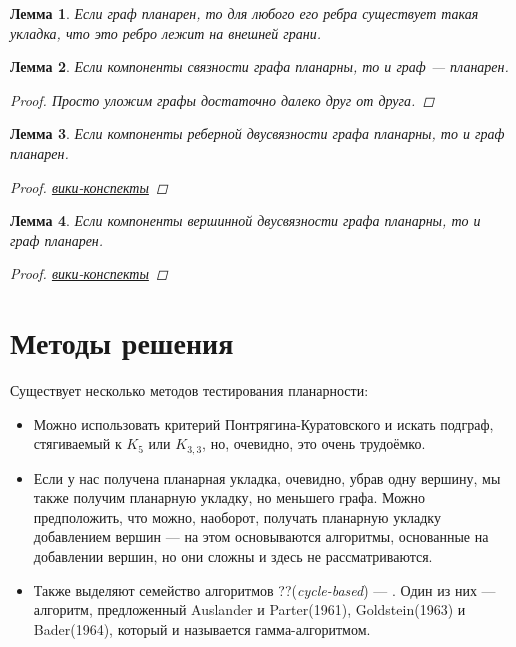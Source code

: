 \documentclass[a4paper, 10pt]{article}
\newtheorem{mylemma}{Лемма}
\begin{document}
\begin{mylemma}
Если граф планарен, то для любого его ребра существует такая укладка, что это ребро лежит на внешней грани.
\end{mylemma}

\begin{mylemma}
Если компоненты связности графа планарны, то и граф — планарен.
\begin{proof}
Просто уложим графы достаточно далеко друг от друга.
\end{proof}
\end{mylemma}

\begin{mylemma}
Если компоненты реберной двусвязности графа планарны, то и граф планарен.
\begin{proof}
\href{http://neerc.ifmo.ru/mediawiki/index.php/%D0%A3%D0%BA%D0%BB%D0%B0%D0%B4%D0%BA%D0%B0_%D0%B3%D1%80%D0%B0%D1%84%D0%B0_%D1%81_%D0%BF%D0%BB%D0%B0%D0%BD%D0%B0%D1%80%D0%BD%D1%8B%D0%BC%D0%B8_%D0%BA%D0%BE%D0%BC%D0%BF%D0%BE%D0%BD%D0%B5%D0%BD%D1%82%D0%B0%D0%BC%D0%B8_%D1%80%D0%B5%D0%B1%D0%B5%D1%80%D0%BD%D0%BE%D0%B9_%D0%B4%D0%B2%D1%83%D1%81%D0%B2%D1%8F%D0%B7%D0%BD%D0%BE%D1%81%D1%82%D0%B8}{вики-конспекты}
\end{proof}
\end{mylemma}

\begin{mylemma}
Если компоненты вершинной двусвязности графа планарны, то и граф планарен.
\begin{proof}
\href{http://neerc.ifmo.ru/mediawiki/index.php/%D0%A3%D0%BA%D0%BB%D0%B0%D0%B4%D0%BA%D0%B0_%D0%B3%D1%80%D0%B0%D1%84%D0%B0_%D1%81_%D0%BF%D0%BB%D0%B0%D0%BD%D0%B0%D1%80%D0%BD%D1%8B%D0%BC%D0%B8_%D0%BA%D0%BE%D0%BC%D0%BF%D0%BE%D0%BD%D0%B5%D0%BD%D1%82%D0%B0%D0%BC%D0%B8_%D0%B2%D0%B5%D1%80%D1%88%D0%B8%D0%BD%D0%BD%D0%BE%D0%B9_%D0%B4%D0%B2%D1%83%D1%81%D0%B2%D1%8F%D0%B7%D0%BD%D0%BE%D1%81%D1%82%D0%B8}{вики-конспекты}
\end{proof}
\end{mylemma}

\section{Методы решения}
Существует несколько методов тестирования планарности:
\begin{itemize}
    \item Можно использовать критерий Понтрягина-Куратовского и искать подграф, стягиваемый к $K_5$ или $K_{3,3}$, но, очевидно, это очень трудоёмко.
    \item Если у нас получена планарная укладка, очевидно, убрав одну вершину, мы также получим планарную укладку, но меньшего графа. Можно предположить, что можно, наоборот, получать планарную укладку добавлением вершин — на этом основываются алгоритмы, основанные на добавлении вершин, но они сложны и здесь не рассматриваются.
    \item Также выделяют семейство алгоритмов ??({\it cycle-based}) — . Один из них — алгоритм, предложенный Auslander и Parter(1961), Goldstein(1963) и Bader(1964), который и называется гамма-алгоритмом.
\end{itemize}
\end{document}
